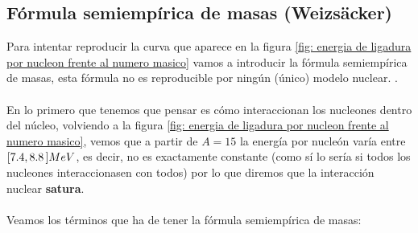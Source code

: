 \subsection{Fórmula semiempírica de masas (Weizsäcker)}

Para intentar reproducir la curva que aparece en la figura \ref{fig: energia de ligadura por nucleon frente al numero masico} vamos a introducir la fórmula semiempírica de masas, esta fórmula no es reproducible por ningún (único) modelo nuclear. .\\\\

En lo primero que tenemos que pensar es cómo interaccionan los nucleones dentro del núcleo, volviendo a la figura \ref{fig: energia de ligadura por nucleon frente al numero masico}, vemos que a partir de $A=15$ la energía por nucleón varía entre $ \unit[[7.4,8.8]]{MeV}$, es decir, no es exactamente constante (como sí lo sería si todos los nucleones interaccionasen con todos) por lo que diremos que la interacción nuclear \textbf{satura}. 
\\\\
Veamos los términos que ha de tener la fórmula semiempírica de masas:

